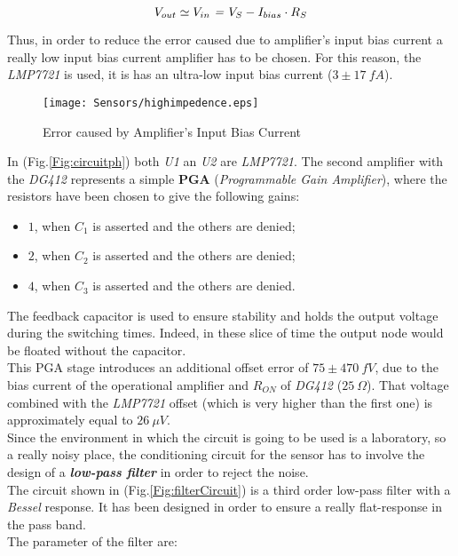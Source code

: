 \begin{equation}
V_{out} \simeq V_{in} \text{ \textit{=} } V_{S} - I_{bias} \cdot R_{S}
\end{equation}

Thus, in order to reduce the error caused due to amplifier's input bias current a really low input bias current amplifier has to be chosen. For this reason, the 
\textit{LMP7721} is used, it is has an ultra-low input bias current ($3 \pm 17\ fA$).\\


\begin{figure}[h]
	\centering
	\texttt{[image: Sensors/highimpedence.eps]}
	\caption{Error caused by Amplifier's Input Bias Current}
	\label{Fig:high}
	
\end{figure}

In (Fig.\ref{Fig:circuitph}) both \textit{U1} an \textit{U2} are \textit{LMP7721}. The second amplifier with the \textit{DG412} represents a simple \textbf{PGA} (\textit{Programmable Gain Amplifier}), where the resistors have been chosen to give the following gains:
\begin{itemize}
	\item $1$, when $C_1$ is asserted and the others are denied;
	\item $2$, when $C_2$ is asserted and the others are denied;
	\item $4$, when $C_3$ is asserted and the others are denied.
\end{itemize}

The feedback capacitor is used to ensure stability and holds the output voltage during the switching times. Indeed, in these slice of time the output node would be floated without the capacitor.\\
This PGA stage introduces an additional offset error of  $75 \pm 470\ fV$, due to the bias current of the operational amplifier and $R_{ON}$ of \textit{DG412} ($25\ \varOmega$). That voltage combined with the \textit{LMP7721} offset (which is very higher than the first one) is approximately equal to $26\ \mu V$.\\

Since the environment in which the circuit is going to be used is a laboratory, so a really noisy place, the conditioning circuit for the sensor has to involve the design of a \textit{\textbf{low-pass filter}} in order to reject the noise.\\

The circuit shown in (Fig.\ref{Fig:filterCircuit}) is a third order low-pass filter with a \textit{Bessel} response. It has been designed in order to ensure a really flat-response in the pass band. \\
The parameter of the filter are:

